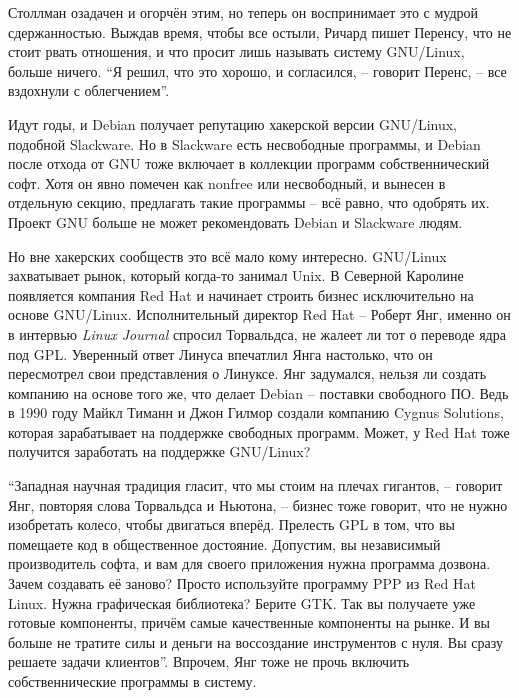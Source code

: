 Столлман озадачен и огорчён этим, но теперь он воспринимает это с мудрой сдержанностью. Выждав время, чтобы все остыли, Ричард пишет Перенсу, что не стоит рвать отношения, и что просит лишь называть систему GNU/Linux, больше ничего. ``Я решил, что это хорошо, и согласился, -- говорит Перенс, -- все вздохнули с облегчением''.

Идут годы, и Debian получает репутацию хакерской версии GNU/Linux, подобной Slackware. Но в Slackware есть несвободные программы, и Debian после отхода от GNU тоже включает в коллекции программ собственнический софт. Хотя он явно помечен как nonfree или несвободный, и вынесен в отдельную секцию, предлагать такие программы -- всё равно, что одобрять их. Проект GNU больше не может рекомендовать Debian и Slackware людям.

Но вне хакерских сообществ это всё мало кому интересно. GNU/Linux захватывает рынок, который когда-то занимал Unix. В Северной Каролине появляется компания Red Hat и начинает строить бизнес исключительно на основе GNU/Linux. Исполнительный директор Red Hat -- Роберт Янг, именно он в интервью \textit{Linux Journal} спросил Торвальдса, не жалеет ли тот о переводе ядра под GPL. Уверенный ответ Линуса впечатлил Янга настолько, что он пересмотрел свои представления о Линуксе. Янг задумался, нельзя ли создать компанию на основе того же, что делает Debian -- поставки свободного ПО. Ведь в 1990 году Майкл Тиманн и Джон Гилмор создали компанию Cygnus Solutions, которая зарабатывает на поддержке свободных программ. Может, у Red Hat тоже получится заработать на поддержке GNU/Linux?

``Западная научная традиция гласит, что мы стоим на плечах гигантов, -- говорит Янг, повторяя слова Торвальдса и Ньютона, -- бизнес тоже говорит, что не нужно изобретать колесо, чтобы двигаться вперёд. Прелесть GPL в том, что вы помещаете код в общественное достояние.  Допустим, вы независимый производитель софта, и вам для своего приложения нужна программа дозвона. Зачем создавать её заново? Просто используйте программу PPP из Red Hat Linux. Нужна графическая библиотека? Берите GTK. Так вы получаете уже готовые компоненты, причём самые качественные компоненты на рынке. И вы больше не тратите силы и деньги на воссоздание инструментов с нуля. Вы сразу решаете задачи клиентов''. Впрочем, Янг тоже не прочь включить собственнические программы в систему.

